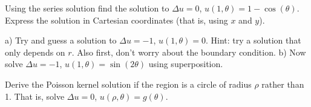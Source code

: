 \begin{exercise}
Using the series solution find the solution to
$\Delta u = 0$, $u(1,\theta) = 1- \cos(\theta)$.  Express the solution
in Cartesian coordinates (that is, using $x$ and $y$).
\end{exercise}

\begin{exercise}
a) Try and guess a solution to $\Delta u = -1$, $u(1,\theta) = 0$.
Hint: try a solution that only depends on $r$.  Also first, don't worry
about the boundary condition.
b) Now solve $\Delta u = -1$, $u(1,\theta) = \sin(2\theta)$ using
superposition.
\end{exercise}

\begin{exercise}[challenging]
Derive the Poisson kernel solution
if the region is a circle of radius $\rho$ rather
than 1.  That is, solve $\Delta u = 0$, $u(\rho,\theta) = g(\theta)$.
\end{exercise}
